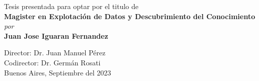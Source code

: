 \begin{titlepage}
\begin{center}
\vspace*{0.5cm}


Tesis presentada para optar por el titulo de\\ 
\vspace*{0.5cm}
{\Large \bf Magister en Explotación de Datos y Descubrimiento del Conocimiento } \\





                      \vspace{10mm}
                   {\em  por} \\ \vspace{3mm}
             {\large \bf Juan Jose Iguaran Fernandez} \\
             
\begin{flushleft}
	Director: Dr. Juan Manuel Pérez\\
	Codirector: Dr. Germán Rosati\\
	\vspace*{1cm}
	Buenos Aires, Septiembre del 2023
\end{flushleft}


\vspace*{10mm}


\vspace*{10mm}


\end{center}

\end{titlepage}

\clearpage

